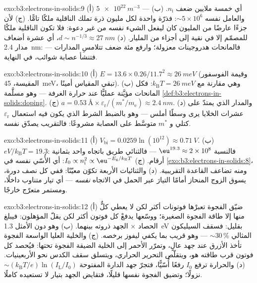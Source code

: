 \begin{solution}{exo:b3:electrons-in-solids:9}
(أ) $\qty{5e22}{m^{-3}}$ --- أي خمسة ملايين ضعف $n_{\text{i}}$.
(ب) والعامل نفسه $\sim5\times10^6$: فذرّة واحدة لكل مليون
ذرة تملك الناقلية ملكًا تامًّا. (ج) لأن جزءًا عارضًا من المليون
كان ليفعل الشيء نفسه من غير دعوة: فلا تكون الناقلية ملكًا للمصمّم
إلا في  نقية إلى أجزاء من المليار. (د) $d \sim n^{-1/3}
\approx \qty{27}{nm}$، أي عشرة أضعاف مدار \qty{2.4}{nm}: فالمانحات
هدروجينات معزولة؛ وارفع  مئة ضعف تتلامسِ
المدارات --- فتنشأ عصابة شوائب،  في النهاية.
\end{solution}

\begin{solution}{exo:b3:electrons-in-solids:10}
(أ) $E = 13.6\times0.26/11.7^2 \approx \qty{26}{meV}$ (وقيمة
الفوسفور المقيسة، \qty{45}{meV}، تبقي المقياس
أمينًا). (ب) وهي مقارنة مع $k_{\text{B}}T = \qty{26}{meV}$:
فكل المانحات مؤيَّنة عمليًّا عند حرارة الغرفة --- وهو
مسلَّمة \cref{def:b3:electrons-in-solids:doping}. (ج) $a =
\qty{0.53}{\angstrom}\times\varepsilon_{\text{r}}/(m^*/
m_{\text{e}}) \approx \qty{2.4}{nm}$. (د) والمدار الذي يمتدّ على
عشرات الخلايا يرى  وسطًا أملس --- وهو
بالضبط الشرط الذي يكون فيه استعمال $\varepsilon_{\text{r}}$ كتلي و
$m^*$ متوسَّط على العصابة مشروعًا:
فالتقريب يصدّق نفسه.
\end{solution}

\begin{solution}{exo:b3:electrons-in-solids:11}
(أ) $V_{\text{bi}} = 0.0259\ln(10^{12}) \approx \qty{0.71}{V}$.
(ب) $eV/k_{\text{B}}T = 19.3$: فالنسبة $\eu^{19.3} \approx
2\times10^{8}$ --- فالثنائي طريق باتجاه واحد بثمانية
أرقام. (ج) $I_0 \propto n_{\text{i}}^2 \propto
\eu^{-E_{\text{g}}/k_{\text{B}}T}$: أي الأُسّي نفسه في
\cref{exo:b3:electrons-in-solids:8}، ومنه
تضاعف القاعدة التقريبية. (د) والثنائيات الأربعة تكوّن معيّنًا: ففي كل
نصف دورة، يسوق الزوج المنحاز أمامًا التيارَ
عبر الحمل في الاتجاه \emph{نفسه} --- أي تيار متناوب داخلًا، ومستمر
متعرّج خارجًا.
\end{solution}

\begin{solution}{exo:b3:electrons-in-solids:12}
(أ) ضيّق الفجوة تعبرْها فوتونات أكثر لكن لا يعطي كلٌّ منها
إلا طاقة الفجوة الصغيرة؛ ووسّعها يدفعْ كل فوتون أكثر
لكن يقلّ المؤهلون: فيبلغ الحصاد $\times$ الجهد ذروته بينهما.
(ب) وهو دون الأمثل \qty{1.3}{eV} بقليل: فسقف السيليكون
المثالي $\sim30\,\%$ --- وهو قريب بما يكفي ليفوز برخصه.
(ج) والخلية العليا الواسعة الفجوة تأخذ الأزرق عند جهد عالٍ، وتمرّر
الأحمر إلى الخلية الضيقة الفجوة تحتها: فيُحصد كل فوتون
قرب طاقته هو، ويتقلّص التحرير الحراري، ويتسلق سقف الكدس
نحو الأربعينيات. (د) والحرارة ترفع $I_0$
رفعًا أُسّيًّا، فتجرّ جهد الدارة المفتوحة
$\sim(k_{\text{B}}T/e)\ln(I_{\text{L}}/I_0)$ نزولًا؛ وتضيق الفجوة نفسها
قليلًا، فتقايض الجهد بتيار لا تستعيده كاملًا.
\end{solution}

